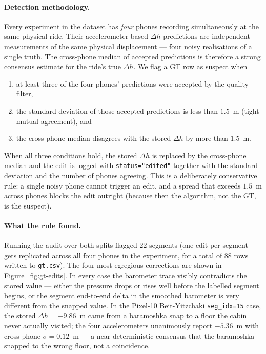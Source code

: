 \paragraph{Detection methodology.} Every experiment in the dataset
has \emph{four} phones recording simultaneously at the same physical
ride. Their accelerometer-based $\Delta h$ predictions are independent
measurements of the same physical displacement — four noisy
realisations of a single truth. The cross-phone median of accepted
predictions is therefore a strong consensus estimate for the ride's
true $\Delta h$. We flag a GT row as suspect when
\begin{enumerate}
  \item at least three of the four phones' predictions were accepted
        by the quality filter,
  \item the standard deviation of those accepted predictions is less
        than $1.5$~m (tight mutual agreement), and
  \item the cross-phone median disagrees with the stored $\Delta h$
        by more than $1.5$~m.
\end{enumerate}
When all three conditions hold, the stored $\Delta h$ is replaced by
the cross-phone median and the edit is logged with
\texttt{status="edited"} together with the standard deviation and
the number of phones agreeing. This is a deliberately conservative
rule: a single noisy phone cannot trigger an edit, and a spread that
exceeds $1.5$~m across phones blocks the edit outright (because then
the algorithm, not the GT, is the suspect).

\paragraph{What the rule found.} Running the audit over both splits
flagged $22$ segments (one edit per segment gets replicated across
all four phones in the experiment, for a total of $88$ rows written
to \texttt{gt.csv}). The four most egregious corrections are shown in
Figure~\ref{fig:gt-edits}. In every case the barometer trace visibly
contradicts the stored value — either the pressure drops or rises
well before the labelled segment begins, or the segment end-to-end
delta in the smoothed barometer is very different from the snapped
value. In the Pixel-10 Beit-Yitzchaki \texttt{seg\_idx=15} case, the
stored $\Delta h = -9.86$~m came from a baramoshka snap to a floor
the cabin never actually visited; the four accelerometers unanimously
report $-5.36$~m with cross-phone $\sigma = 0.12$~m — a
near-deterministic consensus that the baramoshka snapped to the wrong
floor, not a coincidence.

